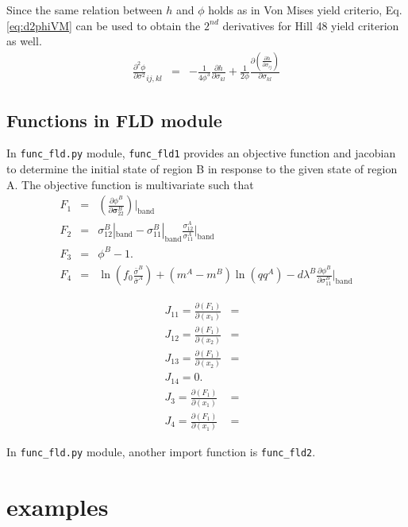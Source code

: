 \documentclass[12pt]{amsart}
\begin{document}
Since the same relation between $h$ and $\phi$ holds as in Von Mises yield criterio, Eq. \ref{eq:d2phiVM} can be used to obtain the $2^{nd}$ derivatives for Hill 48 yield criterion as well.
\begin{eqnarray}
  \label{eq:d2phiHill}
  \frac{\partial^2\phi}{\partial\sigma^2}_{ij,kl}&=& - \frac{1}{4\phi^3} \frac{\partial h}{\partial\sigma_{kl}}  + \frac{1}{2\phi}  \frac{\partial(  \frac{\partial h}{\partial \sigma_{ij}}   )}{\partial\sigma_{kl}}
\end{eqnarray}

\subsection{Functions in FLD module}
In \verb|func_fld.py| module, \verb|func_fld1| provides an objective function and jacobian to determine the initial state of region B in response to the given state of region A.
The objective function is multivariate such that
\begin{eqnarray}
  \label{eq:objf_func_fld1}
  F_1&=& (\frac{\partial \phi^B}{\partial \boldsymbol{\sigma}^B_{22}})|_\text{band}\\
  F_2&=& \sigma_{12}^B|_\text{band}- \sigma_{11}^B|_\text{band} \frac{\sigma_{12}^A}{\sigma_{11}^A}|_\text{band}\\
  F_3&=& \phi^B- 1. \\
  F_4&=& \ln(f_0 \frac{\bar{\sigma}^B}{\bar{\sigma}^A}) + (m^A-m^B) \ln(qq^A) - d\lambda^B \frac{\partial \phi^B}{\partial \sigma^B_{11}}|_\text{band}
\end{eqnarray}



\begin{eqnarray}
  \label{eq:jacob_func_fld1}
  J_{11}=\frac{\partial(F_1)}{\partial(x_1)}&=&  \\
  J_{12}=\frac{\partial(F_1)}{\partial(x_2)}&=&   \\
  J_{13}=\frac{\partial(F_1)}{\partial(x_2)}&=&   \\
  J_{14}=0.                                 &&    \\
  J_{3}=\frac{\partial(F_1)}{\partial(x_1)}&=&    \\
  J_{4}=\frac{\partial(F_1)}{\partial(x_1)}&=&
\end{eqnarray}


In \verb|func_fld.py| module, another import function is \verb|func_fld2|.


\section{examples}
\end{document}
